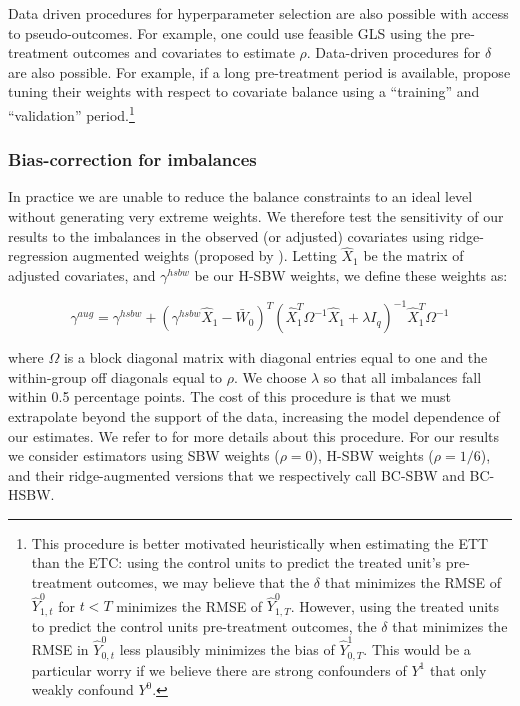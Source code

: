 \documentclass[aoas]{imsart}
\theoremstyle{plain}
\theoremstyle{remark}
\begin{document}
Data driven procedures for hyperparameter selection are also possible with access to pseudo-outcomes. For example, one could use feasible GLS using the pre-treatment outcomes and covariates to estimate $\rho$. Data-driven procedures for $\delta$ are also possible. For example, if a long pre-treatment period is available, \cite{abadie2015synthetic} propose tuning their weights with respect to covariate balance using a ``training'' and ``validation'' period.\footnote{This procedure is better motivated heuristically when estimating the ETT than the ETC: using the control units to predict the treated unit's pre-treatment outcomes, we may believe that the $\delta$ that minimizes the RMSE of $\hat{Y}^0_{1, t}$ for $t < T$ minimizes the RMSE of $\hat{Y}^0_{1, T}$. However, using the treated units to predict the control units pre-treatment outcomes, the $\delta$ that minimizes the RMSE in $\hat{Y}^0_{0, t}$ less plausibly minimizes the bias of $\hat{Y}^1_{0, T}$. This would be a particular worry if we believe there are strong confounders of $Y^1$ that only weakly confound $Y^0$.}

\subsubsection{Bias-correction for imbalances}

In practice we are unable to reduce the balance constraints to an ideal level without generating very extreme weights. We therefore test the sensitivity of our results to the imbalances in the observed (or adjusted) covariates using ridge-regression augmented weights (proposed by \cite{ben2018augmented}). Letting $\hat{X}_1$ be the matrix of adjusted covariates, and $\gamma^{hsbw}$ be our H-SBW weights, we define these weights as:

\begin{equation}
\gamma^{aug} = \gamma^{hsbw} + (\gamma^{hsbw}\hat{X}_1 - \bar{W}_0)^T(\hat{X}_1^T\Omega^{-1}\hat{X}_1 + \lambda I_q)^{-1}\hat{X}_1^T\Omega^{-1}
\end{equation}

where $\Omega$ is a block diagonal matrix with diagonal entries equal to one and the within-group off diagonals equal to $\rho$. We choose $\lambda$ so that all imbalances fall within 0.5 percentage points. The cost of this procedure is that we must extrapolate beyond the support of the data, increasing the model dependence of our estimates. We refer to \cite{ben2018augmented} for more details about this procedure. For our results we consider estimators using SBW weights ($\rho = 0$), H-SBW weights ($\rho = 1/6$), and their ridge-augmented versions that we respectively call BC-SBW and BC-HSBW. 
\end{document}
